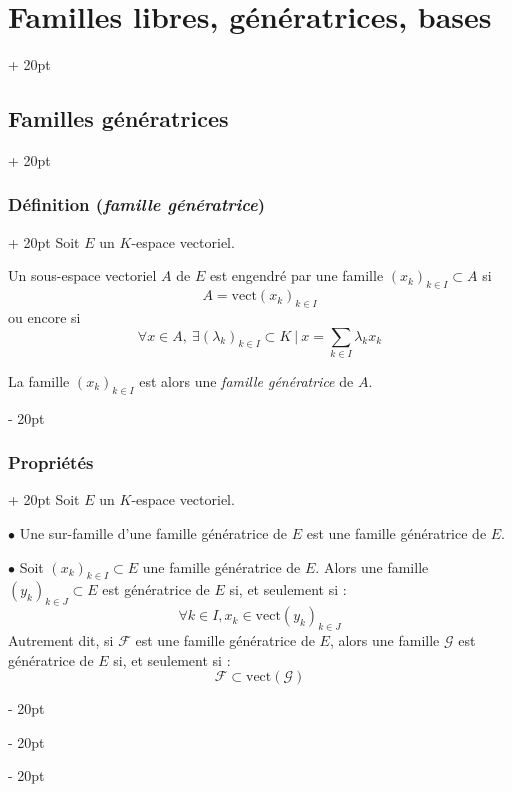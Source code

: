 \documentclass[a4paper, 12pt, twoside]{article}
\newcommand{\ind}[1][20pt]{\advance\leftskip + #1}
\newcommand{\deind}[1][20pt]{\advance\leftskip - #1}
\newenvironment{indt}[2][20pt]{#2 \par \ind[#1]}{\par \deind} %
\begin{document}
    \begin{indt}{\section{Familles libres, génératrices, bases}}
        
        \begin{indt}{\subsection{Familles génératrices}}
            \begin{indt}{\subsubsection{Définition (\textit{famille génératrice})}}
                Soit $E$ un $K$-espace vectoriel.
                
                \vspace{6pt}
                
                Un sous-espace vectoriel $A$ de $E$ est engendré par une famille $(x_k)_{k \in I} \subset A$ si
                    \[ A = \mathrm{vect}(x_k)_{k \in I} \]
                ou encore si
                    \[ \forall x \in A,\ \exists (\lambda_k)_{k \in I} \subset K\ |\ x = \sum_{k \in I} \lambda_k x_k \]
                
                La famille $(x_k)_{k \in I}$ est alors une \textit{famille génératrice} de $A$.
            \end{indt}
            
            \vspace{12pt}
            
            \begin{indt}{\subsubsection{Propriétés}}
                Soit $E$ un $K$-espace vectoriel.
                
                \vspace{6pt}
                
                $\bullet$ Une sur-famille d’une famille génératrice de $E$ est une famille génératrice de $E$.
                
                \vspace{12pt}
                
                $\bullet$ Soit $(x_k)_{k \in I} \subset E$ une famille génératrice de $E$. Alors une famille $(y_k)_{k \in J} \subset E$ est génératrice de $E$ si, et seulement si :
                    \[ \forall k \in I, x_k \in \mathrm{vect}(y_k)_{k \in J} \]
                Autrement dit, si $\mathcal F$ est une famille génératrice de $E$, alors une famille $\mathcal G$ est génératrice de $E$ si, et seulement si :
                    \[ \mathcal F \subset \mathrm{vect}(\mathcal G) \]
                

\end{indt}
\end{indt}
\end{indt}
\end{document}
